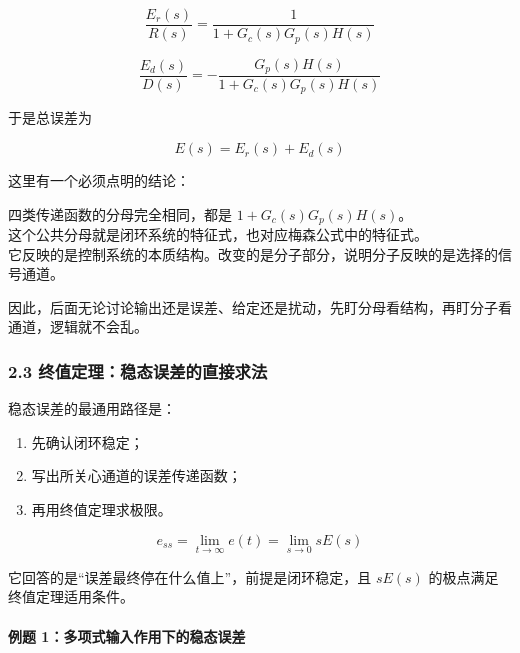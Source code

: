 \documentclass[
  11pt]{article}
\providecommand{\tightlist}{%
  \setlength{\itemsep}{0pt}\setlength{\parskip}{0pt}}
\renewenvironment{quote}
  {\begin{HandoutQuoteBox}\small\color{TitleBlue}\noindent\ignorespaces}
  {\end{HandoutQuoteBox}}
\begin{document}
\begin{equation}
\frac{E_r(s)}{R(s)}=\frac{1}{1+G_c(s)G_p(s)H(s)}
\tag{3-7-5}\label{eq:3-7-input-error}
\end{equation}

\begin{equation}
\frac{E_d(s)}{D(s)}=-\frac{G_p(s)H(s)}{1+G_c(s)G_p(s)H(s)}
\tag{3-7-6}\label{eq:3-7-disturbance-error}
\end{equation}

于是总误差为

\begin{equation}
E(s)=E_r(s)+E_d(s)
\tag{3-7-7}\label{eq:3-7-total-error}
\end{equation}

这里有一个必须点明的结论：

\begin{quote}
四类传递函数的分母完全相同，都是 \(1+G_c(s)G_p(s)H(s)\)。\\
这个公共分母就是闭环系统的特征式，也对应梅森公式中的特征式。\\
它反映的是控制系统的本质结构。改变的是分子部分，说明分子反映的是选择的信号通道。
\end{quote}

因此，后面无论讨论输出还是误差、给定还是扰动，先盯分母看结构，再盯分子看通道，逻辑就不会乱。

\subsubsection{2.3
终值定理：稳态误差的直接求法}\label{ux7ec8ux503cux5b9aux7406ux7a33ux6001ux8befux5deeux7684ux76f4ux63a5ux6c42ux6cd5}

稳态误差的最通用路径是：

\begin{enumerate}
\def\labelenumi{\arabic{enumi}.}
\tightlist
\item
  先确认闭环稳定；
\item
  写出所关心通道的误差传递函数；
\item
  再用终值定理求极限。
\end{enumerate}

\begin{equation}
e_{ss}=\lim_{t\to \infty}e(t)=\lim_{s\to 0}sE(s)
\tag{3-7-8}\label{eq:3-7-final-value}
\end{equation}

它回答的是``误差最终停在什么值上''，前提是闭环稳定，且 \(sE(s)\)
的极点满足终值定理适用条件。

\paragraph{例题
1：多项式输入作用下的稳态误差}\label{ux4f8bux9898-1ux591aux9879ux5f0fux8f93ux5165ux4f5cux7528ux4e0bux7684ux7a33ux6001ux8befux5dee}
\end{document}
